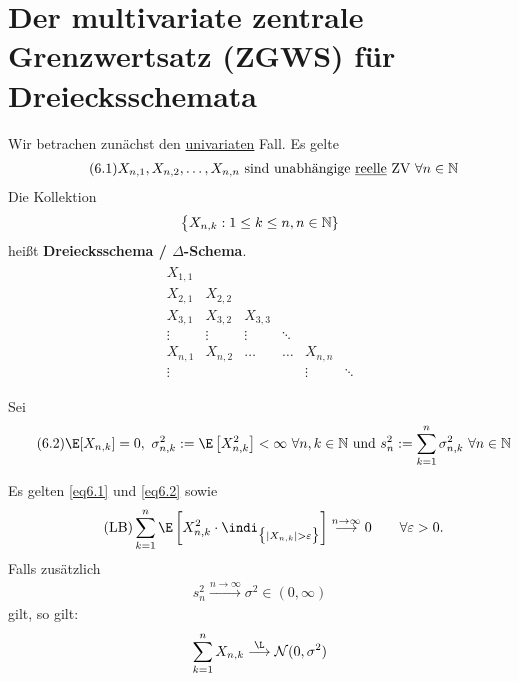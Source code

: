\section{Der multivariate zentrale Grenzwertsatz (ZGWS) für Dreiecksschemata} %
Wir betrachen zunächst den \underline{univariaten} Fall. 
Es gelte
\begin{align}\label{eq6.1}\tag{6.1}
	X_{n,1},X_{n,2},\ldots,X_{n,n}\text{ sind unabhängige \underline{reelle} ZV }\forall n\in\mathbb{N}
\end{align}
Die Kollektion
\begin{align*}
	\big\lbrace X_{n,k}:1\leq k\leq n,n\in\mathbb{N}\rbrace
\end{align*}
heißt \textbf{Dreiecksschema / $\Delta$-Schema}.
\begin{align*}
	\begin{matrix}
		X_{1,1}\\
		X_{2,1} & X_{2,2}\\
		X_{3,1} & X_{3,2} & X_{3,3}\\
		\vdots & \vdots & \vdots & \ddots\\
		X_{n,1} & X_{n,2} & \hdots & \hdots & X_{n,n}\\
		\vdots &&&&\vdots & \ddots
	\end{matrix}
\end{align*}

Sei 
\begin{align}\label{eq6.2}\tag{6.2}
	\E[X_{n,k}]=0,~\sigma_{n,k}^2:=\E\left[X_{n,k}^2\right]<\infty~\forall n,k\in\N\text{ und }
	s_n^2:=\sum\limits_{k=1}^n\sigma_{n,k}^2~\forall n\in\N
\end{align}

\begin{satz}[Lindeberg, 1922]\label{satz6.1Lindeberg1922}\enter
	Es gelten \eqref{eq6.1} und \eqref{eq6.2} sowie
	\begin{align}\label{eqSatz6.1LindebergLB}\tag{LB}
		\sum\limits_{k=1}^n\E\left[X_{n,k}^2\cdot\indi_{\big\lbrace|X_{n,k}|>\varepsilon\big\rbrace}\right]\stackrel{n\to\infty}{\longrightarrow}0\qquad\forall\varepsilon>0.
	\end{align}
	Falls zusätzlich
	\begin{align*}
		s_n^2\stackrel{n\to\infty}{\longrightarrow}\sigma^2\in(0,\infty)
	\end{align*}
	gilt, so gilt:
	\begin{align*}
		\sum\limits_{k=1}^n X_{n,k}\stackrel{\L}{\longrightarrow}\mathcal{N}(0,\sigma^2)
	\end{align*}
\end{satz}

